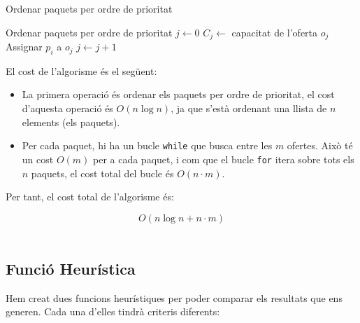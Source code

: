 \documentclass[a4paper]{article}
\begin{document}
	\begin{algorithm} [H]
		\caption{Ordenar paquets per ordre de prioritat}
		\begin{algorithmic}[1]
			\State Ordenar paquets per ordre de prioritat
			\State $j \gets 0$
			\State $C_j \gets$ capacitat de l'oferta $o_j$
			\State Assignar $p_i$ a $o_j$
			\Else
			\State $j \gets j + 1$ 
			\EndIf
			\EndWhile
			\EndFor
		\end{algorithmic}
	\end{algorithm}
	
	El cost de l'algorisme és el següent:
	
	\begin{itemize}
		\item La primera operació és ordenar els paquets per ordre de prioritat, el cost d'aquesta operació és $O(n \log n)$, ja que s'està ordenant una llista de $n$ elements (els paquets).
		\item Per cada paquet, hi ha un bucle \texttt{while} que busca entre les $m$ ofertes. Això té un cost $O(m)$ per a cada paquet, i com que el bucle \texttt{for} itera sobre tots els $n$ paquets, el cost total del bucle és $O(n \cdot m)$.
	\end{itemize}
	
	Per tant, el cost total de l'algorisme és:
	
	\[
	O(n \log n + n \cdot m)
	\]
	\\
	
	\subsection{Funció Heurística}
	
	Hem creat dues funcions heurístiques per poder comparar els resultats que ens generen. Cada una d'elles tindrà criteris diferents:
	
\end{document}

